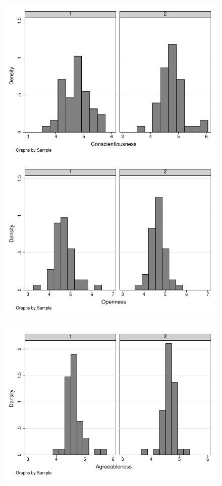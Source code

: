 \documentclass[12pt]{article}%
\begin{document}
\begin{figure}
	\centering
	\includegraphics[]{conscientiousness2.pdf}
	\includegraphics[]{openness2.pdf}
\end{figure}
\begin{figure}
	\centering
	\includegraphics[]{agreeableness2.pdf}
\end{figure}
\end{document}
